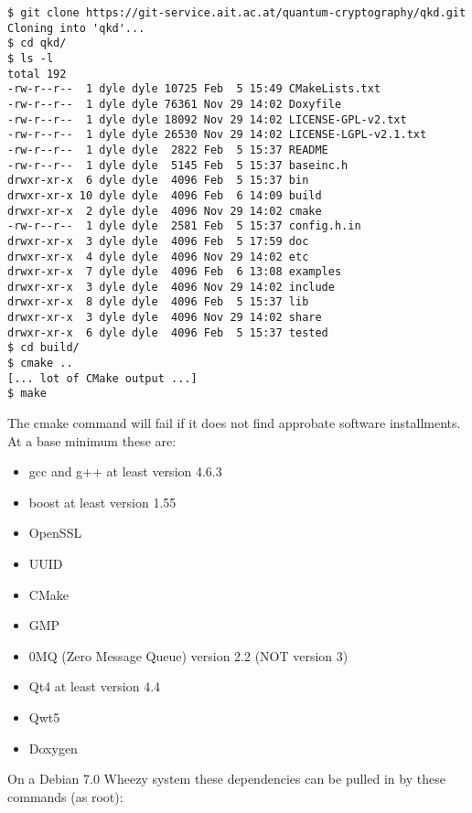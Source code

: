 \begin{minipage}{0.9\textwidth}
\bigskip
\begin{verbatim}
$ git clone https://git-service.ait.ac.at/quantum-cryptography/qkd.git
Cloning into 'qkd'...
$ cd qkd/
$ ls -l
total 192
-rw-r--r--  1 dyle dyle 10725 Feb  5 15:49 CMakeLists.txt
-rw-r--r--  1 dyle dyle 76361 Nov 29 14:02 Doxyfile
-rw-r--r--  1 dyle dyle 18092 Nov 29 14:02 LICENSE-GPL-v2.txt
-rw-r--r--  1 dyle dyle 26530 Nov 29 14:02 LICENSE-LGPL-v2.1.txt
-rw-r--r--  1 dyle dyle  2822 Feb  5 15:37 README
-rw-r--r--  1 dyle dyle  5145 Feb  5 15:37 baseinc.h
drwxr-xr-x  6 dyle dyle  4096 Feb  5 15:37 bin
drwxr-xr-x 10 dyle dyle  4096 Feb  6 14:09 build
drwxr-xr-x  2 dyle dyle  4096 Nov 29 14:02 cmake
-rw-r--r--  1 dyle dyle  2581 Feb  5 15:37 config.h.in
drwxr-xr-x  3 dyle dyle  4096 Feb  5 17:59 doc
drwxr-xr-x  4 dyle dyle  4096 Nov 29 14:02 etc
drwxr-xr-x  7 dyle dyle  4096 Feb  6 13:08 examples
drwxr-xr-x  3 dyle dyle  4096 Nov 29 14:02 include
drwxr-xr-x  8 dyle dyle  4096 Feb  5 15:37 lib
drwxr-xr-x  3 dyle dyle  4096 Nov 29 14:02 share
drwxr-xr-x  6 dyle dyle  4096 Feb  5 15:37 tested
$ cd build/
$ cmake ..
[... lot of CMake output ...]
$ make
\end{verbatim}
\medskip
\end{minipage}

The cmake command will fail if it does not find approbate software installments. At a base minimum these are:

\begin{itemize}

    \item gcc and g++ at least version 4.6.3
    \item boost at least version 1.55
    \item OpenSSL
    \item UUID
    \item CMake
    \item GMP
    \item 0MQ (Zero Message Queue) version 2.2 (NOT version 3)
    \item Qt4 at least version 4.4
    \item Qwt5
    \item Doxygen

\end{itemize}

\clearpage

On a Debian 7.0 Wheezy system these dependencies can be pulled in by these commands (as root):

